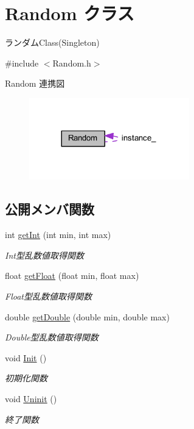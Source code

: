\hypertarget{class_random}{}\section{Random クラス}
\label{class_random}


ランダム\+Class(\+Singleton)  




{\ttfamily \#include $<$Random.\+h$>$}



Random 連携図\nopagebreak
\begin{figure}[H]
\begin{center}
\leavevmode
\includegraphics[width=197pt]{class_random__coll__graph}
\end{center}
\end{figure}
\subsection*{公開メンバ関数}
\begin{DoxyCompactItemize}
\item 
int \mbox{\hyperlink{class_random_a7aac570ca0e486704a9c7f27ea884fe6}{get\+Int}} (int min, int max)
\begin{DoxyCompactList}\small\item\em Int型乱数値取得関数 \end{DoxyCompactList}\item 
float \mbox{\hyperlink{class_random_a7c208cfc4a9859dbf23bd45e73e26ffa}{get\+Float}} (float min, float max)
\begin{DoxyCompactList}\small\item\em Float型乱数値取得関数 \end{DoxyCompactList}\item 
double \mbox{\hyperlink{class_random_a90608f1db0e83ce6dcf7a5df43bce02e}{get\+Double}} (double min, double max)
\begin{DoxyCompactList}\small\item\em Double型乱数値取得関数 \end{DoxyCompactList}\item 
void \mbox{\hyperlink{class_random_a9feade8fc8026ed3e7aad3b1cdd9b55a}{Init}} ()
\begin{DoxyCompactList}\small\item\em 初期化関数 \end{DoxyCompactList}\item 
void \mbox{\hyperlink{class_random_a3bf09c7188122af5008037b46390c3e7}{Uninit}} ()
\begin{DoxyCompactList}\small\item\em 終了関数 \end{DoxyCompactList}\end{DoxyCompactItemize}
